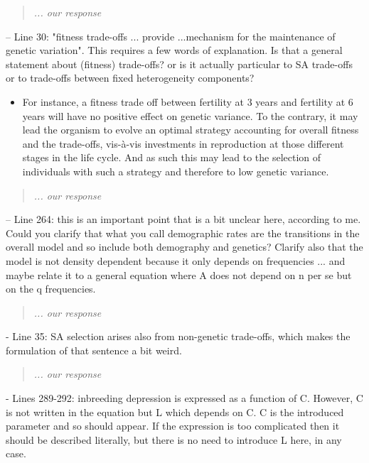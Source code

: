\documentclass[11pt]{article}
\begin{document}
\begin{quote}
	{\itshape ... our response}
\end{quote}

\noindent -- Line 30: "fitness trade-offs ... provide ...mechanism for the maintenance of genetic variation". This requires a few words of explanation. Is that a general statement about (fitness) trade-offs? or is it actually particular to SA trade-offs or to trade-offs between fixed heterogeneity components?
\begin{itemize}
	\item For instance, a fitness trade off between fertility at 3 years and fertility at 6 years will have no positive effect on genetic variance. To the contrary, it may lead the organism to evolve an optimal strategy accounting for overall fitness and the trade-offs, vis-à-vis investments in reproduction at those different stages in the life cycle. And as such this may lead to the selection of individuals with such a strategy and therefore to low genetic variance.
\end{itemize}

\begin{quote}
	{\itshape ... our response}
\end{quote}


\noindent -- Line 264: this is an important point that is a bit unclear here, according to me. Could you clarify that what you call demographic rates are the transitions in the overall model and so include both demography and genetics? Clarify also that the model is not density dependent because it only depends on frequencies ... and maybe relate it to a general equation where A does not depend on n per se but on the q frequencies.

\begin{quote}
	{\itshape ... our response}
\end{quote}

- Line 35: SA selection arises also from non-genetic trade-offs, which makes the formulation of that sentence a bit weird.

\begin{quote}
	{\itshape ... our response}
\end{quote}

- Lines 289-292: inbreeding depression is expressed as a function of C. However, C is not written in the equation but L which depends on C. C is the introduced parameter and so should appear. If the expression is too complicated then it should be described literally, but there is no need to introduce L here, in any case.
\end{document}
